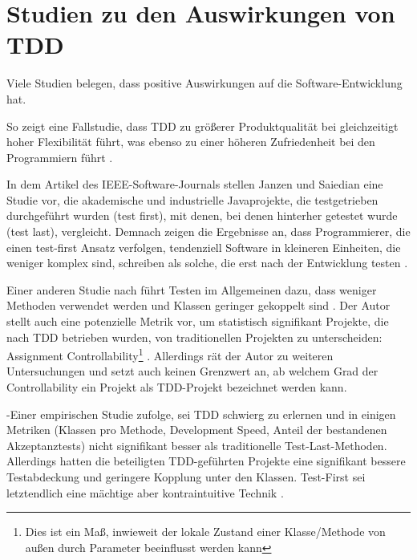 \section{Studien zu den Auswirkungen von TDD}

Viele Studien belegen, dass  positive Auswirkungen auf die Software-Entwicklung hat.


So zeigt eine Fallstudie, dass TDD zu größerer Produktqualität bei gleichzeitigt hoher Flexibilität führt, was ebenso zu einer höheren Zufriedenheit bei den Programmiern führt \citep{hans_wasmus_evaluation_2007}.




In dem Artikel des IEEE-Software-Journals stellen Janzen und Saiedian eine Studie vor, die akademische und industrielle Javaprojekte, die testgetrieben durchgeführt wurden (test first), mit denen, bei denen hinterher getestet wurde (test last), vergleicht. Demnach zeigen die Ergebnisse an, dass Programmierer, die einen test-first Ansatz verfolgen, tendenziell Software in kleineren Einheiten, die weniger komplex sind, schreiben als solche, die erst nach der Entwicklung testen \citep{janzen_does_2008}.


Einer anderen Studie nach führt Testen im Allgemeinen dazu, dass weniger Methoden verwendet werden und Klassen geringer gekoppelt sind \cite{mueller_effect_2006}. Der Autor stellt auch eine potenzielle Metrik vor, um statistisch signifikant Projekte, die nach TDD betrieben wurden, von traditionellen Projekten zu unterscheiden: Assignment Controllability\footnote{Dies ist ein Maß, inwieweit der lokale Zustand einer Klasse/Methode von außen durch Parameter beeinflusst werden kann} \cite{mueller_effect_2006}. Allerdings rät der Autor zu weiteren Untersuchungen und setzt auch keinen Grenzwert an, ab welchem Grad der Controllability ein Projekt als TDD-Projekt bezeichnet werden kann.

-Einer empirischen Studie zufolge, sei TDD schwierg zu erlernen und in einigen Metriken (Klassen pro Methode, Development Speed, Anteil der bestandenen Akzeptanztests) nicht signifikant besser als traditionelle Test-Last-Methoden. Allerdings hatten die beteiligten TDD-geführten Projekte eine signifikant bessere Testabdeckung und geringere Kopplung unter den Klassen. Test-First sei letztendlich eine mächtige aber kontraintuitive Technik \citep{madeyski_test-driven_2009}.

